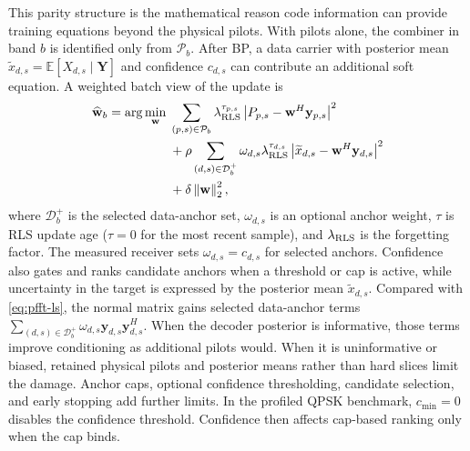 \documentclass[journal]{IEEEtran}
\newcommand{\Ht}{^{H}}
\newcommand{\norm}[1]{\left\lVert #1 \right\rVert}
\newcommand{\abs}[1]{\left\lvert #1 \right\rvert}
\begin{document}
This parity structure is the mathematical reason code information can provide
training equations beyond the physical pilots. With pilots alone, the combiner in
band $b$ is identified only from $\mathcal P_b$. After BP, a data carrier with
posterior mean $\widetilde x_{d,s}=\mathbb E[X_{d,s}\mid\mathbf Y]$ and
confidence $c_{d,s}$ can contribute an additional soft equation. A weighted batch
view of the update is
\begin{equation}
  \begin{aligned}
  \widehat{\mathbf w}_b
  =\arg\min_{\mathbf w}\;&
  \sum_{(p,s)\in\mathcal P_b}
      \lambda_{\rm RLS}^{\tau_{p,s}}
      \abs{P_{p,s}-\mathbf w\Ht\mathbf y_{p,s}}^2\\
  &+\rho\sum_{(d,s)\in\mathcal D_b^+}\omega_{d,s}
      \lambda_{\rm RLS}^{\tau_{d,s}}
      \abs{\widetilde x_{d,s}-\mathbf w\Ht\mathbf y_{d,s}}^2\\
  &+\delta\norm{\mathbf w}_2^2 ,
  \end{aligned}
  \label{eq:soft-pilot-ls}
\end{equation}
where $\mathcal D_b^+$ is the selected data-anchor set, $\omega_{d,s}$ is an
optional anchor weight, $\tau$ is RLS update age ($\tau=0$ for the most recent
sample), and $\lambda_{\rm RLS}$ is the forgetting factor. The measured receiver
sets $\omega_{d,s}=c_{d,s}$ for selected anchors. Confidence also gates and
ranks candidate anchors when a threshold or cap is active, while uncertainty in
the target is expressed by the posterior mean $\widetilde x_{d,s}$. Compared with
\eqref{eq:pfft-ls}, the normal matrix gains selected data-anchor terms
$\sum_{(d,s)\in\mathcal D_b^+}\omega_{d,s}\mathbf y_{d,s}\mathbf y_{d,s}\Ht$.
When the decoder posterior is informative, those terms improve conditioning as
additional pilots would. When it is uninformative or biased, retained physical
pilots and posterior means rather than hard slices limit the damage. Anchor caps,
optional confidence thresholding, candidate selection, and early stopping add
further limits. In the profiled QPSK benchmark, $c_{\min}=0$ disables the
confidence threshold. Confidence then affects cap-based ranking only when the
cap binds.
\end{document}
